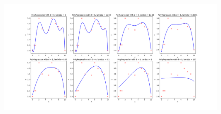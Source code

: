\documentclass{article}
\newcommand{\1}{\mathbf{1}}
\begin{document}
{\begin{figure}[!ht]
  \centering
  \includegraphics[width=218mm]{../hw1-code/results/a4_compilation.png}
\end{figure}

\newpage

}
\end{document}
